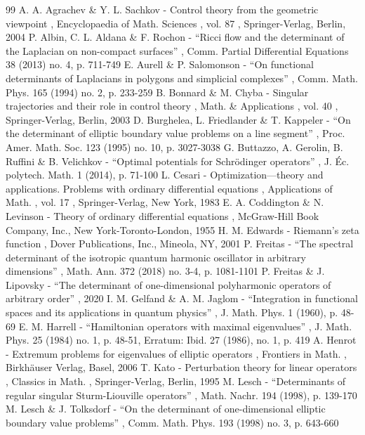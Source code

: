 \begin{thebibliography}{99}
 A. A. Agrachev \& Y. L. Sachkov - Control theory from the geometric viewpoint , Encyclopaedia of Math. Sciences , vol. 87 , Springer-Verlag, Berlin, 2004
 P. Albin, C. L. Aldana \& F. Rochon - “Ricci flow and the determinant of the Laplacian on non-compact surfaces” , Comm. Partial Differential Equations 38 (2013) no. 4, p. 711-749
 E. Aurell \& P. Salomonson - “On functional determinants of Laplacians in polygons and simplicial complexes” , Comm. Math. Phys. 165 (1994) no. 2, p. 233-259
 B. Bonnard \& M. Chyba - Singular trajectories and their role in control theory , Math. \& Applications , vol. 40 , Springer-Verlag, Berlin, 2003
 D. Burghelea, L. Friedlander \& T. Kappeler - “On the determinant of elliptic boundary value problems on a line segment” , Proc. Amer. Math. Soc. 123 (1995) no. 10, p. 3027-3038
 G. Buttazzo, A. Gerolin, B. Ruffini \& B. Velichkov - “Optimal potentials for Schrödinger operators” , J. Éc. polytech. Math. 1 (2014), p. 71-100
 L. Cesari - Optimization—theory and applications. Problems with ordinary differential equations , Applications of Math. , vol. 17 , Springer-Verlag, New York, 1983
 E. A. Coddington \& N. Levinson - Theory of ordinary differential equations , McGraw-Hill Book Company, Inc., New York-Toronto-London, 1955
 H. M. Edwards - Riemann’s zeta function , Dover Publications, Inc., Mineola, NY, 2001
 P. Freitas - “The spectral determinant of the isotropic quantum harmonic oscillator in arbitrary dimensions” , Math. Ann. 372 (2018) no. 3-4, p. 1081-1101
 P. Freitas \& J. Lipovsky - “The determinant of one-dimensional polyharmonic operators of arbitrary order” , 2020
 I. M. Gelfand \& A. M. Jaglom - “Integration in functional spaces and its applications in quantum physics” , J. Math. Phys. 1 (1960), p. 48-69
 E. M. Harrell - “Hamiltonian operators with maximal eigenvalues” , J. Math. Phys. 25 (1984) no. 1, p. 48-51, Erratum: Ibid. 27 (1986), no. 1, p. 419
 A. Henrot - Extremum problems for eigenvalues of elliptic operators , Frontiers in Math. , Birkhäuser Verlag, Basel, 2006
 T. Kato - Perturbation theory for linear operators , Classics in Math. , Springer-Verlag, Berlin, 1995
 M. Lesch - “Determinants of regular singular Sturm-Liouville operators” , Math. Nachr. 194 (1998), p. 139-170
 M. Lesch \& J. Tolksdorf - “On the determinant of one-dimensional elliptic boundary value problems” , Comm. Math. Phys. 193 (1998) no. 3, p. 643-660

\end{thebibliography}

